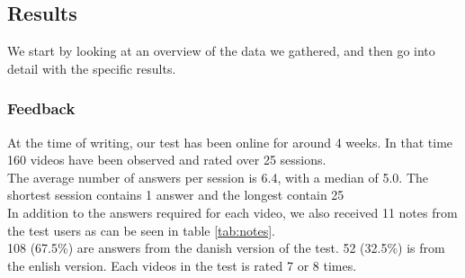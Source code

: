 \subsection{Results}
%
We start by looking at an overview of the data we gathered, and then go into detail with the specific results.
%
\subsubsection{Feedback}
%
At the time of writing, our test has been online for around 4 weeks. In that time 160 videos have been observed and rated over 25 sessions.\\
The average number of answers per session is 6.4, with a median of 5.0. The shortest session contains 1 answer and the longest contain 25\\
In addition to the answers required for each video, we also received 11 notes from the test users as can be seen in table \ref{tab:notes}.\\
108 (67.5\%) are answers from the danish version of the test. 52 (32.5\%) is from the enlish version. Each videos in the test is rated 7 or 8 times.
%
